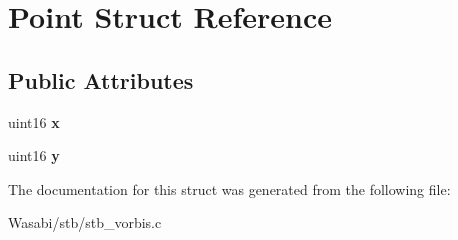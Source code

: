 \hypertarget{struct_point}{}\section{Point Struct Reference}
\label{struct_point}
\subsection*{Public Attributes}
\begin{DoxyCompactItemize}
\item 
uint16 {\bfseries x}\hypertarget{struct_point_acf4344b8b6a222cc131abb712b7d74e3}{}\label{struct_point_acf4344b8b6a222cc131abb712b7d74e3}

\item 
uint16 {\bfseries y}\hypertarget{struct_point_a76a9d6dae27038adb1dc0c4c6cc8ed82}{}\label{struct_point_a76a9d6dae27038adb1dc0c4c6cc8ed82}

\end{DoxyCompactItemize}


The documentation for this struct was generated from the following file\+:\begin{DoxyCompactItemize}
\item 
Wasabi/stb/stb\+\_\+vorbis.\+c\end{DoxyCompactItemize}
